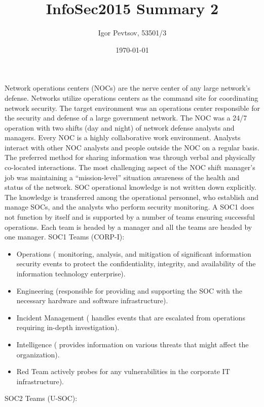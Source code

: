 \documentclass[14pt]{article}
\title{InfoSec2015 Summary 2}
\date{\today}
\author{Igor Pevtsov, 53501/3}
\begin{document}
  	\maketitle

	Network operations centers (NOCs) are the nerve center of any large network’s defense. Networks utilize operations centers as the command site for coordinating network security.
	The target environment was an operations center responsible for the security and defense of a large government network. The NOC was a 24/7 operation with two shifts (day and night) of network defense analysts and managers. Every NOC is a highly collaborative work environment. Analysts interact with other NOC analysts and people outside the NOC on a regular basis. The preferred method for sharing information was through verbal and physically co-located interactions. The most challenging aspect of the NOC shift manager’s job was maintaining a “mission-level” situation awareness of the health and status of the network.
	SOC operational knowledge is not written down explicitly. The knowledge is transferred among the operational personnel, who establish and manage SOCs, and the analysts who perform security monitoring. A SOC1 does not function by itself and is supported by a number of teams ensuring successful operations. Each team is headed by a manager and all the teams are headed by one manager. SOC1 Teams (CORP-I):
		\begin{itemize}
		\item Operations ( monitoring, analysis, and mitigation of signiﬁcant information security events to protect the conﬁdentiality, integrity, and availability of the information technology enterprise).
		\item Engineering (responsible for providing and supporting the SOC with the necessary hardware and software infrastructure).
		\item Incident Management ( handles events that are escalated from operations requiring in-depth investigation).
		\item Intelligence ( provides information on various threats that might aﬀect the organization).
		\item Red Team  actively probes for any vulnerabilities in the corporate IT infrastructure).
		\end{itemize}
	SOC2 Teams (U-SOC):
\end{document}

